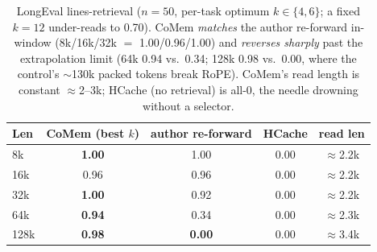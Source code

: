 \begin{table}[t]
\centering
\small
\setlength{\tabcolsep}{4pt}
\begin{tabular}{@{}lcccc@{}}
\toprule
\textbf{Len} & \textbf{CoMem} (best $k$) & \textbf{author re-forward} & \textbf{HCache} & \textbf{read len} \\
\midrule
8k   & \textbf{1.00} & 1.00 & 0.00 & $\approx$2.2k \\
16k  & 0.96 & 0.96 & 0.00 & $\approx$2.2k \\
32k  & \textbf{1.00} & 0.92 & 0.00 & $\approx$2.2k \\
64k  & \textbf{0.94} & 0.34 & 0.00 & $\approx$2.3k \\
128k & \textbf{0.98} & \textbf{0.00} & 0.00 & $\approx$3.4k \\
\bottomrule
\end{tabular}
\caption{LongEval lines-retrieval ($n{=}50$, per-task optimum
$k\in\{4,6\}$; a fixed $k{=}12$ under-reads to 0.70). CoMem \emph{matches}
the author re-forward in-window (8k/16k/32k $=$ 1.00/0.96/1.00) and \emph{reverses sharply}
past the extrapolation limit (64k 0.94 vs.\ 0.34; 128k 0.98 vs.\ 0.00, where
the control's $\sim$130k packed tokens break RoPE). CoMem's read length is
constant $\approx$2--3k; HCache (no retrieval) is all-0, the needle drowning
without a selector.}
\label{tab:longeval}
\end{table}
